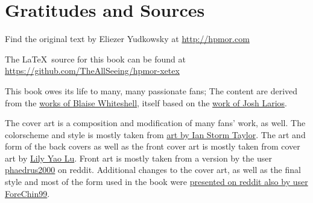 
\pagebreak
\chapter*{Gratitudes and Sources}

{

    \setlength{\parindent}{0pt}

    Find the original text by Eliezer Yudkowsky at \url{http://hpmor.com}

    \vspace{0.25cm}
    The \LaTeX\ source for this book can be found at \url{https://github.com/TheAllSeeing/hpmor-xetex}

    \vspace{0.25cm}
    This book owes its life to many, many passionate fans; The content are derived from the \href{https://github.com/xenohedron/hpmor-xetex}{works of Blaise Whiteshell},
    itself based on the \href{https://github.com/rjl20/hpmor}{work of Josh Larios}.

    \vspace{0.25cm}
    The cover art is a composition and modification of many fans' work, as well. The colorscheme and style is mostly taken from \href{https://github.com/ianstormtaylor/hpmor}{art by Ian Storm Taylor}.
    The art and form of the back covers \ifnum{} as well as the front cover art \fi is mostly taken from cover art by \href{https://github.com/knuesel/hpmor}{Lily Yao Lu}. Front art is mostly taken from a version by the user \href{https://www.reddit.com/r/HPMOR/comments/70sug6/yet_another_set_of_printed_books/}{phaedrus2000} on reddit. Additional changes to the cover art, as well as the final style and most of the form used in the book were \href{https://www.reddit.com/r/HPMOR/comments/hvlhkm/trying_to_make_my_own_book_covers_am_i_winning/}{presented on reddit also by user ForeChin99}.
}
